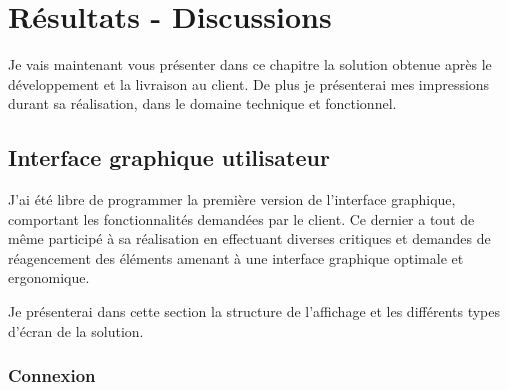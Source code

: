 \cleardoublepage

\chapter{Résultats - Discussions}

Je vais maintenant vous présenter dans ce chapitre la solution obtenue après le développement et la livraison au client.
De plus je présenterai mes impressions durant sa réalisation, dans le domaine technique et fonctionnel.


\section{Interface graphique utilisateur}

J'ai été libre de programmer la première version de l'interface graphique, comportant les fonctionnalités demandées par le client.
Ce dernier a tout de même participé à sa réalisation en effectuant diverses critiques et demandes de réagencement des éléments amenant à une interface graphique optimale et ergonomique.

Je présenterai dans cette section la structure de l'affichage et les différents types d'écran de la solution.


\subsection{Connexion}

